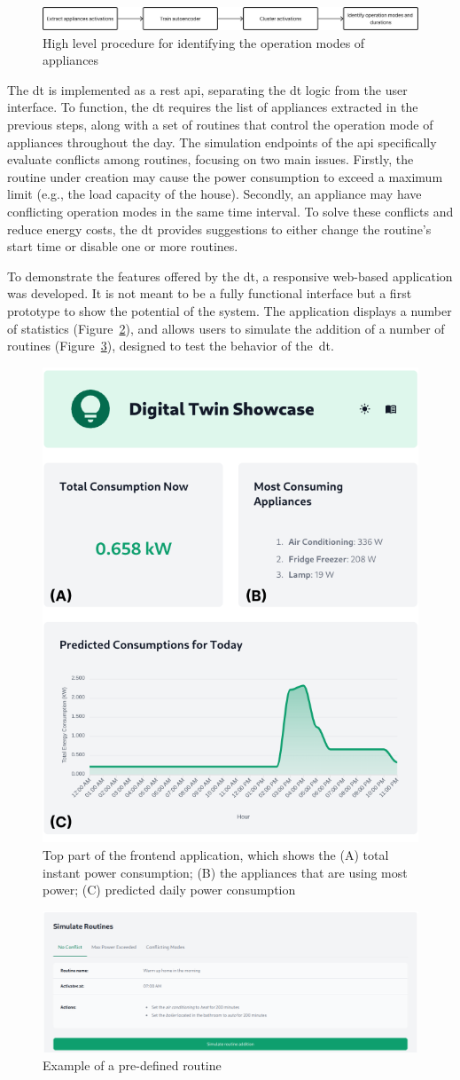 \begin{figure}[b]
    \centering
    \includegraphics[width=\linewidth]{images/high_level_procedure.png}
    \caption{High level procedure for identifying the operation modes of appliances}%
    \label{fig:high-level-procedure}
\end{figure}

The \acrshort*{dt} is implemented as a \acrshort*{rest} \acrshort*{api}, separating the \acrshort*{dt} logic from the user interface. To function, the \acrshort*{dt} requires the list of appliances extracted in the previous steps, along with a set of routines that control the operation mode of appliances throughout the day. The simulation endpoints of the \acrshort*{api} specifically evaluate conflicts among routines, focusing on two main issues. Firstly, the routine under creation may cause the power consumption to exceed a maximum limit (e.g., the load capacity of the house). Secondly, an appliance may have conflicting operation modes in the same time interval. To solve these conflicts and reduce energy costs, the \acrshort*{dt} provides suggestions to either change the routine's start time or disable one or more routines.

To demonstrate the features offered by the \acrshort*{dt}, a responsive web-based application was developed. It is not meant to be a fully functional interface but a first prototype to show the potential of the system. The application displays a number of statistics (Figure~\ref{fig:frontend}), and allows users to simulate the addition of a number of routines (Figure~\ref{fig:simulate}), designed to test the behavior of the~\acrshort*{dt}.

\begin{figure}[htb]
    \centering
    \includegraphics[width=.45\linewidth]{images/responsive.png}
    \caption{Top part of the frontend application, which shows the (A) total instant power consumption; (B) the appliances that are using most power; (C) predicted daily power consumption}%
    \label{fig:frontend}
\end{figure}

\begin{figure}[htb]
    \centering
    \includegraphics[width=.55\linewidth]{images/simulate.png}
    \caption{Example of a pre-defined routine}%
    \label{fig:simulate}
\end{figure}

